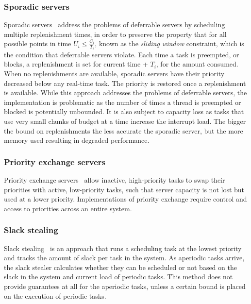 \subsubsection{Sporadic servers}
\label{p:sporadic} 

Sporadic servers~\citep{Sprunt_SL_89a} address the problems of
deferrable servers by scheduling multiple replenishment times, in order to preserve the property
that for all possible points in time $U_{i} \leq \frac{C_{i}}{T_{i}}$, known as the \emph{sliding window} constraint, which
is the condition that deferrable servers violate.  Each time a task is preempted, or blocks, a
replenishment is set for current time + $T_{i}$, for the amount consumed.  When no replenishments are
available, sporadic servers have their priority decreased below any real-time task.  The priority is
restored once a replenishment is available.  While this approach addresses the problems of deferrable
servers, the implementation is problematic as the number of times a thread is preempted or blocked
is potentially unbounded.  It is also subject to capacity loss as tasks that use very small chunks
of budget at a time increase the interrupt load.  The bigger the bound on replenishments the less
accurate the sporadic server, but the more memory used resulting in degraded performance.

\subsubsection{Priority exchange servers}

Priority exchange servers~\citep{Sprunt_SL_89a, Spuri_Buttazzo_94} allow inactive, high-priority tasks to swap their
priorities with active, low-priority tasks, such that server capacity is not lost but used at a lower
priority. Implementations of priority exchange require control and access to priorities across an
entire system.

\subsubsection{Slack stealing}

Slack stealing~\citep{Ramos_Thuel_Lehoczky_93} is an approach that runs a scheduling
task at the lowest priority and tracks the amount of slack per task in the system.  As aperiodic
tasks arrive, the slack stealer calculates whether they can be scheduled or not based on the slack
in the system and current load of periodic tasks.  This method does not provide guarantees at all
for the aperiodic tasks, unless a certain bound is placed on the execution of periodic tasks.

